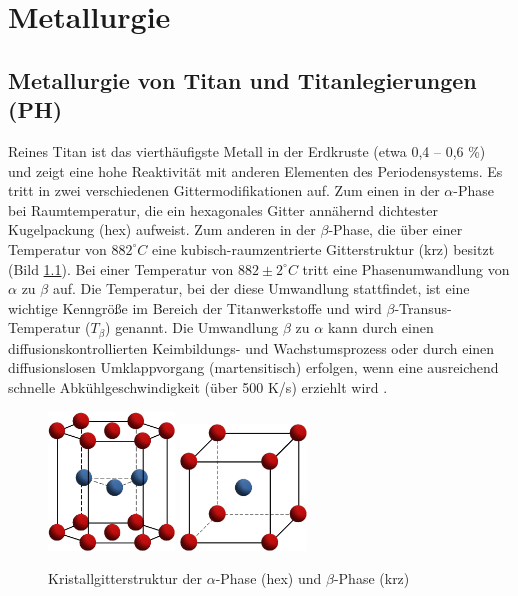 \chapter{Metallurgie}	


\section{Metallurgie von Titan und Titanlegierungen (PH)}
Reines Titan ist das vierthäufigste Metall in der Erdkruste (etwa 0,4 -- 0,6 \%) und zeigt eine hohe Reaktivität mit anderen Elementen des Periodensystems. Es tritt in zwei verschiedenen Gittermodifikationen auf. Zum einen in der $\alpha$-Phase bei Raumtemperatur, die ein hexagonales Gitter annähernd dichtester Kugelpackung (hex) aufweist. Zum anderen in der $\beta$-Phase, die über einer Temperatur von $882 ^\circ C$ eine kubisch-raumzentrierte Gitterstruktur (krz) besitzt (Bild \ref{fig:Kristallgitter}). Bei einer Temperatur von $882 \pm 2 ^\circ C$ tritt eine Phasenumwandlung von $\alpha$ zu $\beta$ auf. Die Temperatur, bei der diese Umwandlung stattfindet, ist eine wichtige Kenngröße im Bereich der Titanwerkstoffe und wird $\beta$-Transus-Temperatur ($T_{\beta}$) genannt.
Die Umwandlung $\beta$ zu $\alpha$ kann durch einen diffusionskontrollierten Keimbildungs- und Wachstumsprozess oder durch einen diffusionslosen Umklappvorgang (martensitisch) erfolgen, wenn eine ausreichend schnelle Abkühlgeschwindigkeit (über 500 K/s) erziehlt wird \cite{C.Leyens.2005,Lutjering.2007}.

\begin{figure}[h]
	\centering
	\subfloat{}
	\includegraphics[width=0.3\textwidth]{./Bilder/hcp}
	\hspace{4ex}
	\subfloat{}
	\includegraphics[width=0.3\textwidth]{Bilder/krz}
	\caption{Kristallgitterstruktur der $\alpha$-Phase (hex) und $\beta$-Phase (krz)}
	\label{fig:Kristallgitter}
\end{figure}


